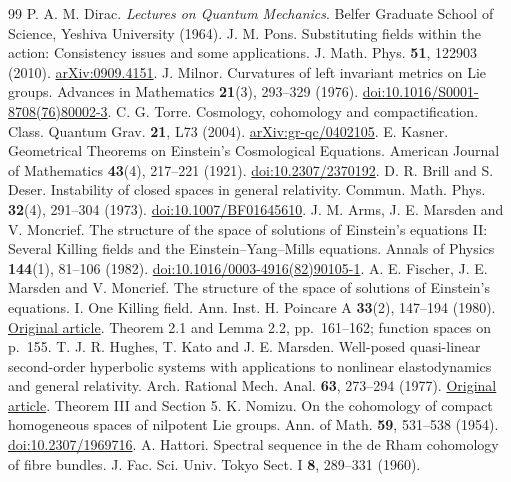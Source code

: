 \documentclass[11pt,a4paper]{article}
\begin{document}
\begin{thebibliography}{99}
 P. A. M. Dirac. \emph{Lectures on Quantum Mechanics}. Belfer Graduate School of Science, Yeshiva University (1964).
 J. M. Pons. Substituting fields within the action: Consistency issues and some applications. J. Math. Phys. \textbf{51}, 122903 (2010). \href{https://arxiv.org/abs/0909.4151}{arXiv:0909.4151}.
 J. Milnor. Curvatures of left invariant metrics on Lie groups. Advances in Mathematics \textbf{21}(3), 293--329 (1976). \href{https://doi.org/10.1016/S0001-8708(76)80002-3}{doi:10.1016/S0001-8708(76)80002-3}.
 C. G. Torre. Cosmology, cohomology and compactification. Class. Quantum Grav. \textbf{21}, L73 (2004). \href{https://arxiv.org/abs/gr-qc/0402105}{arXiv:gr-qc/0402105}.
 E. Kasner. Geometrical Theorems on Einstein's Cosmological Equations. American Journal of Mathematics \textbf{43}(4), 217--221 (1921). \href{https://doi.org/10.2307/2370192}{doi:10.2307/2370192}.
 D. R. Brill and S. Deser. Instability of closed spaces in general relativity. Commun. Math. Phys. \textbf{32}(4), 291--304 (1973). \href{https://doi.org/10.1007/BF01645610}{doi:10.1007/BF01645610}.
 J. M. Arms, J. E. Marsden and V. Moncrief. The structure of the space of solutions of Einstein's equations II: Several Killing fields and the Einstein--Yang--Mills equations. Annals of Physics \textbf{144}(1), 81--106 (1982). \href{https://doi.org/10.1016/0003-4916(82)90105-1}{doi:10.1016/0003-4916(82)90105-1}.
 A. E. Fischer, J. E. Marsden and V. Moncrief. The structure of the space of solutions of Einstein's equations. I. One Killing field. Ann. Inst. H. Poincare A \textbf{33}(2), 147--194 (1980). \href{https://www.numdam.org/item/AIHPA_1980__33_2_147_0/}{Original article}. Theorem 2.1 and Lemma 2.2, pp.~161--162; function spaces on p.~155.
 T. J. R. Hughes, T. Kato and J. E. Marsden. Well-posed quasi-linear second-order hyperbolic systems with applications to nonlinear elastodynamics and general relativity. Arch. Rational Mech. Anal. \textbf{63}, 273--294 (1977). \href{https://www.cds.caltech.edu/~marsden/bib/1977/02-HuKaMa1977/HuKaMa1977.pdf}{Original article}. Theorem III and Section 5.
 K. Nomizu. On the cohomology of compact homogeneous spaces of nilpotent Lie groups. Ann. of Math. \textbf{59}, 531--538 (1954). \href{https://doi.org/10.2307/1969716}{doi:10.2307/1969716}.
 A. Hattori. Spectral sequence in the de Rham cohomology of fibre bundles. J. Fac. Sci. Univ. Tokyo Sect. I \textbf{8}, 289--331 (1960).

\end{thebibliography}
\end{document}
